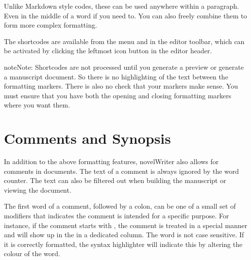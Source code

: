 \documentclass[a4paper,11pt,english]{sphinxmanual}
\begin{document}
\sphinxAtStartPar
Unlike Markdown style codes, these can be used anywhere within a paragraph. Even in the middle of a
word if you need to. You can also freely combine them to form more complex formatting.

\sphinxAtStartPar
The shortcodes are available from the  menu and in the editor toolbar, which can be
activated by clicking the left\sphinxhyphen{}most icon button in the editor header.

\begin{sphinxadmonition}{note}{Note:}
\sphinxAtStartPar
Shortcodes are not processed until you generate a preview or generate a manuscript document. So
there is no highlighting of the text between the formatting markers. There is also no check that
your markers make sense. You must ensure that you have both the opening and closing formatting
markers where you want them.
\end{sphinxadmonition}

\sphinxAtStartPar
{}


\section{Comments and Synopsis}
\label{\detokenize{usage_format:comments-and-synopsis}}\label{\detokenize{usage_format:a-fmt-comm}}
\sphinxAtStartPar
In addition to the above formatting features, novelWriter also allows for comments in documents.
The text of a comment is always ignored by the word counter. The text can also be filtered out
when building the manuscript or viewing the document.

\sphinxAtStartPar
The first word of a comment, followed by a colon, can be one of a small set of modifiers that
indicates the comment is intended for a specific purpose. For instance, if the comment starts with
, the comment is treated in a special manner and will show up in the
{\hyperref[\detokenize{usage_project:a-ui-outline}]{}} in a dedicated column. The word  is not case sensitive. If it is
correctly formatted, the syntax highlighter will indicate this by altering the colour of the word.
\end{document}
